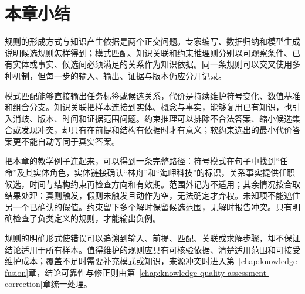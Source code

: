 \section{本章小结}
\label{sec:rule-based-knowledge-acquisition-summary}

规则的形成方式与知识产生依据是两个正交问题。专家编写、数据归纳和模型生成说明候选规则怎样得到；模式匹配、知识关联和约束推理则分别以可观察条件、已有实体或事实、候选间必须满足的关系作为知识依据。同一条规则可以交叉使用多种机制，但每一步的输入、输出、证据与版本仍应分开记录。

模式匹配能够直接输出任务标签或候选关系，代价是持续维护符号变化、数值基准和组合分支。知识关联把样本连接到实体、概念与事实，能够复用已有知识，也引入消歧、版本、时间和证据范围问题。约束推理可以排除不合法答案、缩小候选集合或发现冲突，却只有在前提和结构有依据时才有意义；软约束选出的最小代价答案更不能自动等同于真实答案。

把本章的教学例子连起来，可以得到一条完整路径：符号模式在句子中找到“任命”及其实体角色，实体链接确认“林舟”和“海岬科技”的标识，关系事实提供任职候选，时间与结构约束再检查方向和有效期。范围外记为不适用；其余情况按合取结果处理：真则触发，假则未触发且动作为空，无法确定才弃权。未知项不能遮住另一个已确认的假值。约束留下多个解时保留候选范围，无解时报告冲突。只有明确检查了负类定义的规则，才能输出负例。

规则的明确形式使错误可以追溯到输入、前提、匹配、关联或求解步骤，却不保证结论适用于所有样本。值得维护的规则应具有可核验依据、清楚适用范围和可接受维护成本；覆盖不足时需要补充模式或知识，来源冲突时进入第~\ref{chap:knowledge-fusion}章，结论可靠性与修正则由第~\ref{chap:knowledge-quality-assessment-correction}章统一处理。
